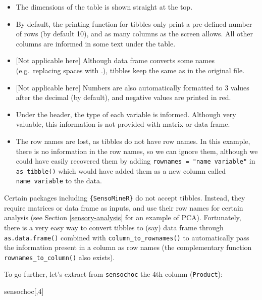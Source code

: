 \documentclass[
]{krantz}
\makeatletter
\newenvironment{Shaded}{\begin{snugshade}}{\end{snugshade}}
\newcommand{\DecValTok}[1]{\textcolor[rgb]{0.06,0.06,0.06}{#1}}
\newcommand{\NormalTok}[1]{#1}
\providecommand{\tightlist}{%
  \setlength{\itemsep}{0pt}\setlength{\parskip}{0pt}}
\renewenvironment{quote}{\begin{VF}}{\end{VF}}
\newenvironment{kframe}{%
\medskip{}
\setlength{\fboxsep}{.8em}
 \def\at@end@of@kframe{}%
 \ifinner\ifhmode%
  \def\at@end@of@kframe{\end{minipage}}%
  \begin{minipage}{\columnwidth}%
 \fi\fi%
 \def\FrameCommand##1{\hskip\@totalleftmargin \hskip-\fboxsep
 \colorbox{shadecolor}{##1}\hskip-\fboxsep
     \hskip-\linewidth \hskip-\@totalleftmargin \hskip\columnwidth}%
 \MakeFramed {\advance\hsize-\width
   \@totalleftmargin\z@ \linewidth\hsize
   \@setminipage}}%
 {\par\unskip\endMakeFramed%
 \at@end@of@kframe}
\renewenvironment{Shaded}{\begin{kframe}}{\end{kframe}}
\makeatother
\begin{document}
\begin{itemize}
\tightlist
\item
  The dimensions of the table is shown straight at the top.
\item
  By default, the printing function for tibbles only print a pre-defined number of rows (by default 10), and as many columns as the screen allows. All other columns are informed in some text under the table.
\item
  {[}Not applicable here{]} Although data frame converts some names (e.g.~replacing spaces with .), tibbles keep the same as in the original file.
\item
  {[}Not applicable here{]} Numbers are also automatically formatted to 3 values after the decimal (by default), and negative values are printed in red.
\item
  Under the header, the type of each variable is informed. Although very valuable, this information is not provided with matrix or data frame.
\item
  The row names are lost, as tibbles do not have row names. In this example, there is no information in the row names, so we can ignore them, although we could have easily recovered them by adding \texttt{rownames\ =\ "name\ variable"} in \texttt{as\_tibble()} which would have added them as a new column called \texttt{name\ variable} to the data.
\end{itemize}

\begin{quote}
Certain packages including \texttt{\{SensoMineR\}} do not accept tibbles. Instead, they require matrices or data frame as inputs, and use their row names for certain analysis (see Section \ref{sensory-analysis} for an example of PCA). Fortunately, there is a very easy way to convert tibbles to (say) data frame through \texttt{as.data.frame()} combined with \texttt{column\_to\_rownames()} to automatically pass the information present in a column as row names (the complementary function \texttt{rownames\_to\_column()} also exists).
\end{quote}

To go further, let's extract from \texttt{sensochoc} the 4th column (\texttt{Product}):

\begin{Shaded}
\begin{Highlighting}[]
\NormalTok{sensochoc[,}\DecValTok{4}\NormalTok{]}
\end{Highlighting}
\end{Shaded}
\end{document}
